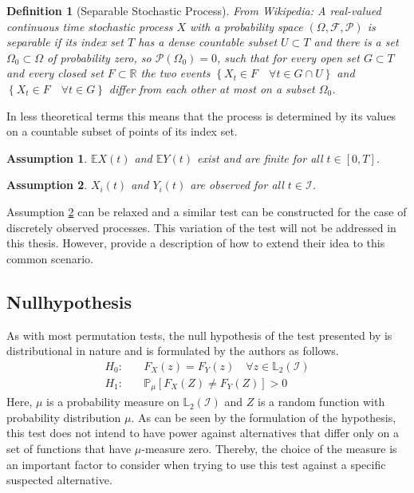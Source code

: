 \documentclass[12pt, a4paper]{article}
\theoremstyle{MAstyle} \newtheorem{assumption}{Assumption}[section]
\theoremstyle{MAstyle} \newtheorem{definition}{Definition}[section]
\theoremstyle{MAstyle} \newtheorem{theorem}{Theorem}[section]
\begin{document}
			\begin{definition}[Separable Stochastic Process]
				{\color{red} From Wikipedia:} A real-valued continuous time stochastic process $X$ with a probability space $\left(\Omega, \mathcal{F}, \mathcal{P}\right)$ is separable if its index set $T$ has a dense countable subset $U \subset T$ and there is a set $\Omega_0 \subset \Omega$ of probability zero, so $\mathcal{P}\left(\Omega_0\right) = 0$, such that for every open set $G \subset T$ and every closed set $F \subset \mathbb{R}$ the two events $\left\{X_t \in F \quad \forall t \in G \cap U\right\}$ and $\left\{X_t \in F \quad \forall t \in G\right\}$ differ from each other at most on a subset $\Omega_0$.
			\end{definition}
		
			In less theoretical terms this means that the process is determined by its values on a countable subset of points of its index set.
		
			\begin{assumption}
				$\mathbb{E}X(t)$ and $\mathbb{E}Y(t)$ exist and are finite for all $t \in [0, T]$.
			\end{assumption}
		
			\begin{assumption}\label{continuous_observation}
				$X_i(t)$ and $Y_i(t)$ are observed for all $t \in \mathcal{I}$.
			\end{assumption}
			Assumption \ref{continuous_observation} can be relaxed and a similar test can be constructed for the case of discretely observed processes. This variation of the test will not be addressed in this thesis. However, \cite{bugni_permutation_2021} provide a description of how to extend their idea to this common scenario.
	
		\subsection{Nullhypothesis}
			As with most permutation tests, the null hypothesis of the test presented by \cite{bugni_permutation_2021} is distributional in nature and is formulated by the authors as follows.
			\begin{equation}
				\begin{split}
					H_0: \quad &F_X(z) = F_Y(z) \quad \forall z \in \mathbb{L}_2(\mathcal{I}) \\
					H_1: \quad &\mathbb{P}_{\mu}\left[F_X(Z) \neq F_Y(Z)\right] > 0
				\end{split}
			\end{equation}
			Here, $\mu$ is a probability measure on $\mathbb{L}_2(\mathcal{I})$ and $Z$ is a random function with probability distribution $\mu$. As can be seen by the formulation of the hypothesis, this test does not intend to have power against alternatives that differ only on a set of functions that have $\mu$-measure zero. Thereby, the choice of the measure is an important factor to consider when trying to use this test against a specific suspected alternative.  
		
\end{document}
